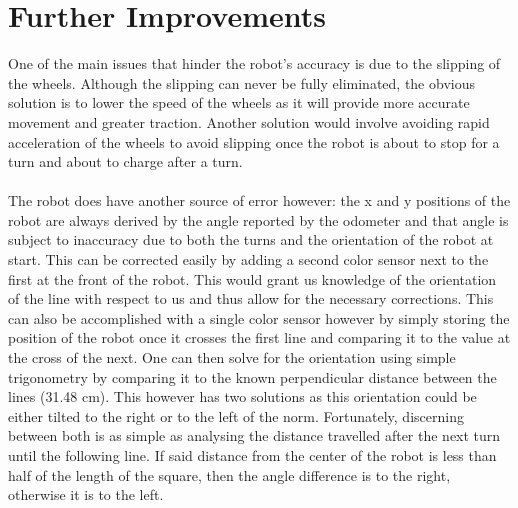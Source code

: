 \documentclass[letterpaper,12pt]{article}
\begin{document}
\section{Further Improvements}{
One of the main issues that hinder the robot's accuracy is due to the slipping of the wheels. Although the slipping can never be fully eliminated, the obvious solution is to lower the speed of the wheels as it will provide more accurate movement and greater traction. Another solution would involve avoiding rapid acceleration of the wheels to avoid slipping once the robot is about to stop for a turn and about to charge after a turn.\\\\
The robot does have another source of error however: the x and y positions of the robot are always derived by the angle reported by the odometer and that angle is subject to inaccuracy due to both the turns and the orientation of the robot at start. This can be corrected easily by adding a second color sensor next to the first at the front of the robot. This would grant us knowledge of the orientation of the line with respect to us and thus allow for the necessary corrections. This can also be accomplished with a single color sensor however by simply storing the position of the robot once it crosses the first line and comparing it to the value at the cross of the next. One can then solve for the orientation using simple trigonometry by comparing it to the known perpendicular distance between the lines (31.48 cm). This however has two solutions as this orientation could be either tilted to the right or to the left of the norm. Fortunately, discerning between both is as simple as analysing the distance travelled after the next turn until the following line. If said distance from the center of the robot is less than half of the length of the square, then the angle difference is to the right, otherwise it is to the left.
}
\end{document}
